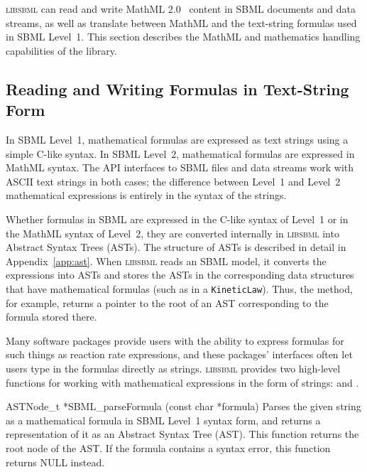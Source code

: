 \documentclass{sbmlmanual}
\newcommand{\libsbml}{\textsc{libsbml}}
\begin{document}
\libsbml{} can read and write MathML 2.0~\citep{w3c:2000b} content in SBML
documents and data streams, as well as translate between MathML and the
text-string formulas used in SBML Level~1.  This section describes the
MathML and mathematics handling capabilities of the library.


\subsection{Reading and Writing Formulas in Text-String Form}
\label{sec:text-string-math}

In SBML Level~1, mathematical formulas are expressed as text strings using
a simple C-like syntax.  In SBML Level~2, mathematical formulas are
expressed in MathML syntax.  The API interfaces to SBML files and data
streams work with ASCII text strings in both cases; the difference between
Level~1 and Level~2 mathematical expressions is entirely in the syntax of
the strings.

Whether formulas in SBML are expressed in the C-like syntax of Level~1 or
in the MathML syntax of Level~2, they are converted internally in
\libsbml{} into Abstract Syntax Trees (ASTs).  The structure of ASTs is
described in detail in Appendix~\ref{app:ast}.  When \libsbml{} reads an
SBML model, it converts the expressions into ASTs and stores the ASTs in
the corresponding data structures that have mathematical formulas (such as
in a \texttt{KineticLaw}).  Thus, the  method,
for example, returns a pointer to the root of an AST corresponding to the
formula stored there.

Many software packages provide users with the ability to express formulas
for such things as reaction rate expressions, and these packages'
interfaces often let users type in the formulas directly as strings.
\libsbml{} provides two high-level functions for working with mathematical
expressions in the form of strings:  and
.

\begin{methoddef}{ASTNode\_t *SBML\_parseFormula (const char *formula)}
  Parses the given string as a mathematical formula in SBML Level~1 syntax
  form, and returns a representation of it as an Abstract Syntax Tree
  (AST).  This function returns the root node of the AST.  If the formula
  contains a syntax error, this function returns NULL instead.
\end{methoddef}
\end{document}
